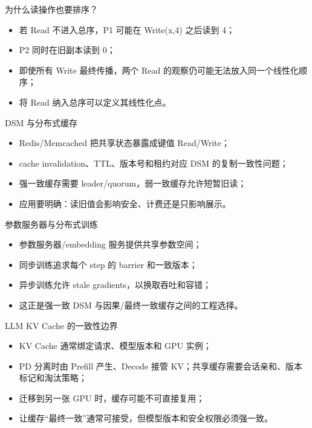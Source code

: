 \documentclass[UTF8,fontset=none,aspectratio=169,10pt]{beamer}
\begin{document}
\begin{frame}{为什么读操作也要排序？}
\begin{itemize}
  \item 若 Read 不进入总序，P1 可能在 Write(x,4) 之后读到 4；
  \item P2 同时在旧副本读到 0；
  \item 即使所有 Write 最终传播，两个 Read 的观察仍可能无法放入同一个线性化顺序；
  \item 将 Read 纳入总序可以定义其线性化点。
\end{itemize}
\end{frame}


\begin{frame}{DSM 与分布式缓存}
\begin{itemize}
  \item Redis/Memcached 把共享状态暴露成键值 Read/Write；
  \item cache invalidation、TTL、版本号和租约对应 DSM 的复制一致性问题；
  \item 强一致缓存需要 leader/quorum，弱一致缓存允许短暂旧读；
  \item 应用要明确：读旧值会影响安全、计费还是只影响展示。
\end{itemize}
\end{frame}

\begin{frame}{参数服务器与分布式训练}
\begin{itemize}
  \item 参数服务器/embedding 服务提供共享参数空间；
  \item 同步训练追求每个 step 的 barrier 和一致版本；
  \item 异步训练允许 stale gradients，以换取吞吐和容错；
  \item 这正是强一致 DSM 与因果/最终一致缓存之间的工程选择。
\end{itemize}
\end{frame}

\begin{frame}{LLM KV Cache 的一致性边界}
\begin{itemize}
  \item KV Cache 通常绑定请求、模型版本和 GPU 实例；
  \item PD 分离时由 Prefill 产生、Decode 接管 KV；共享缓存需要会话亲和、版本标记和淘汰策略；
  \item 迁移到另一张 GPU 时，缓存可能不可直接复用；
  \item 让缓存“最终一致”通常可接受，但模型版本和安全权限必须强一致。
\end{itemize}
\end{frame}
\end{document}
